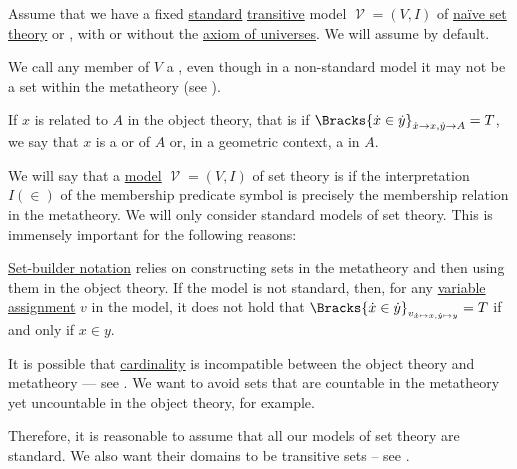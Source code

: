 \begin{definition}\label{def:set}\mimprovised
  Assume that we have a fixed \hyperref[rem:standard_model_of_set_theory]{standard} \hyperref[rem:transitive_model_of_set_theory]{transitive} model \( \mscrV = (V, I) \) of \hyperref[def:naive_set_theory]{na\"ive set theory} or \hyperref[def:zfc]{}, with or without the \hyperref[def:axiom_of_universes]{axiom of universes}. We will assume  by default.

  We call any member of \( V \) a , even though in a non-standard model it may not be a set within the metatheory (see ).

  If \( x \) is related to \( A \) in the object theory, that is if \( \Bracks{\synx \in \syny}_{\synx \to x, \syny \to A} = T \), we say that \( x \) is a  or  of \( A \) or, in a geometric context, a  in \( A \).
\end{definition}

\begin{remark}\label{rem:standard_model_of_set_theory}
  We will say that a \hyperref[def:first_order_model]{model} \( \mscrV = (V, I) \) of set theory is  if the interpretation \( I(\in) \) of the membership predicate symbol is precisely the membership relation in the metatheory. We will only consider standard models of set theory. This is immensely important for the following reasons:

  \begin{itemize}
     \hyperref[def:set_builder_notation]{Set-builder notation} relies on constructing sets in the metatheory and then using them in the object theory. If the model is not standard, then, for any \hyperref[def:first_order_valuation/variable_assignment]{variable assignment} \( v \) in the model, it does not hold that \( \Bracks{\synx \in \syny}_{v_{\synx \mapsto x, \syny \mapsto y}} = T \) if and only if \( x \in y \).

     It is possible that \hyperref[thm:cardinality_existence]{cardinality} is incompatible between the object theory and metatheory --- see . We want to avoid sets that are countable in the metatheory yet uncountable in the object theory, for example.
  \end{itemize}

  Therefore, it is reasonable to assume that all our models of set theory are standard. We also want their domains to be transitive sets -- see .
\end{remark}

